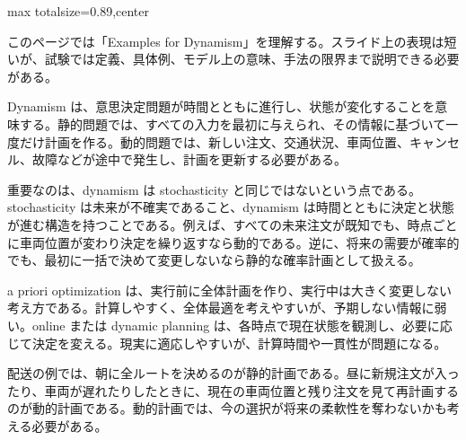 \begin{minipage}[t]{0.58\textwidth}
\begin{adjustbox}{max totalsize={\textwidth}{0.89\textheight},center}
\begin{minipage}{\textwidth}\scriptsize
{}このページでは「Examples for Dynamism」を理解する。スライド上の表現は短いが、試験では定義、具体例、モデル上の意味、手法の限界まで説明できる必要がある。\par
Dynamism は、意思決定問題が時間とともに進行し、状態が変化することを意味する。静的問題では、すべての入力を最初に与えられ、その情報に基づいて一度だけ計画を作る。動的問題では、新しい注文、交通状況、車両位置、キャンセル、故障などが途中で発生し、計画を更新する必要がある。\par
重要なのは、dynamism は stochasticity と同じではないという点である。stochasticity は未来が不確実であること、dynamism は時間とともに決定と状態が進む構造を持つことである。例えば、すべての未来注文が既知でも、時点ごとに車両位置が変わり決定を繰り返すなら動的である。逆に、将来の需要が確率的でも、最初に一括で決めて変更しないなら静的な確率計画として扱える。\par
a priori optimization は、実行前に全体計画を作り、実行中は大きく変更しない考え方である。計算しやすく、全体最適を考えやすいが、予期しない情報に弱い。online または dynamic planning は、各時点で現在状態を観測し、必要に応じて決定を変える。現実に適応しやすいが、計算時間や一貫性が問題になる。\par
配送の例では、朝に全ルートを決めるのが静的計画である。昼に新規注文が入ったり、車両が遅れたりしたときに、現在の車両位置と残り注文を見て再計画するのが動的計画である。動的計画では、今の選択が将来の柔軟性を奪わないかも考える必要がある。\par

\end{minipage}
\end{adjustbox}
\end{minipage}
